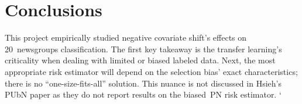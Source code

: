 \section{Conclusions}\label{sec:Conclusions}

This project empirically studied negative covariate shift's effects on 20~newsgroups classification.  The first key takeaway is the transfer learning's criticality when dealing with limited or biased labeled data.  Next, the most appropriate risk estimator will depend on the selection bias' exact characteristics; there is no ``one-size-fits-all'' solution.  This nuance is not discussed in Hsieh\etal's PUbN paper as they do not report results on the biased~PN risk estimator. `

